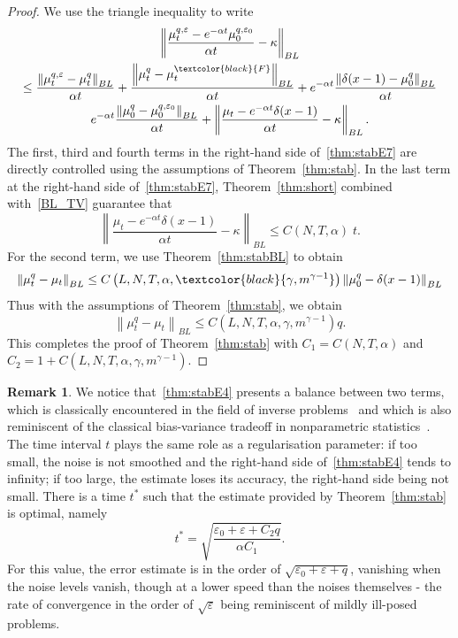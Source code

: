 \documentclass[10pt]{amsart}
\theoremstyle{definition}\newtheorem{defi}[theo]{Definition}\newtheorem{rema}[theo]{Remark}\newtheorem{exam}[theo]{Example}\newtheorem{exem}[theo]{Example}\newtheorem{nota}[theo]{Notation}
\newcommand*\eps{\varepsilon}
\renewcommand*\a{\alpha}
\newcommand{\MT}[1]{\textcolor{black}{#1}}
\begin{document}
\begin{proof}
We use the triangle inequality to write
\begin{multline}\label{thm:stabE7}
\left\|\frac{\mu_t^{q,\eps} - e^{-\a t} \mu_0^{q,\eps_0} }{\a t}-\kappa\right\|_{BL}\\
\leq \frac{\left\|\mu_t^{q,\eps} -\mu_t^{q}\right\|_{BL}}{\a t} +\frac{\left\|\mu_t^{q} -\mu_t^{\MT{F}}\right\|_{BL}}{\a t} +e^{-\a t}\frac{\left\|\delta(x-1) -\mu_0^q\right\|_{BL}}{\a t}
\\
e^{-\a t}\frac{\left\|\mu_0^q- \mu_0^{q,\eps_0}\right\|_{BL}}{\a t} + \left\|\frac{\mu_t - e^{-\a t} \delta(x-1) }{\a t}-\kappa\right\|_{BL}.
\end{multline}
The first, third and fourth terms in the right-hand side of~\eqref{thm:stabE7} are directly controlled using the assumptions of Theorem~\ref{thm:stab}. In the last term at the right-hand side of~\eqref{thm:stabE7}, Theorem~\ref{thm:short} combined with~\eqref{BL_TV} guarantee that
\begin{equation*}
\left\|\frac{\mu_t - e^{-\a t} \delta(x-1) }{\a t}-\kappa\right\|_{BL}\leq C(N,T,\alpha)\; t.
\end{equation*}
For the second term, we use Theorem~\ref{thm:stabBL} to obtain
\begin{equation*}
\left\|\mu_t^{q} -\mu_t\right\|_{BL}
\leq C\left(L,N,T,\alpha,\MT{\gamma,m^{\gamma-1}}\right) \left\|\mu_0^q-\delta(x-1)\right\|_{BL}
\end{equation*}
Thus with the assumptions of Theorem~\ref{thm:stab}, we obtain
\begin{equation*}
\left\|\mu_t^{q} -\mu_t\right\|_{BL}
\leq  C\left(L,N,T,\alpha,\gamma,m^{\gamma-1}\right) q.
\end{equation*}
This completes the proof of Theorem~\ref{thm:stab} with $C_1= C(N,T,\alpha)$
\newline and $C_2=1+C(L,N,T,\alpha,\gamma,m^{\gamma-1}).$
\end{proof}

\begin{rema}\label{rem:t_optimal}
We notice that~\eqref{thm:stabE4} presents a balance between two terms, which is classically encountered in the field of inverse problems~\cite{Engl} and which is also reminiscent of the classical bias-variance tradeoff in nonparametric statistics~\cite{GineNickl2016}. The time interval $t$ plays the same role as a regularisation parameter: if too small, the noise is not smoothed and the right-hand side of~\eqref{thm:stabE4} tends to infinity; if too large, the estimate loses its accuracy, the right-hand side being not small. There is a time $t^*$ such that the estimate provided by Theorem~\ref{thm:stab} is optimal, namely
\begin{equation}\label{t_opt}
t^*=\sqrt{\frac{\eps_0+\eps+C_2q}{\alpha C_1}}.
\end{equation}
For this value, the error estimate is in the order of $\sqrt{\eps_0+\eps+ q}$, vanishing when the noise levels vanish, though at a lower speed than the noises themselves - the rate of convergence in the order of $\sqrt{\eps}$ being reminiscent of mildly ill-posed problems.
\end{rema}
\end{document}
